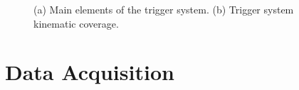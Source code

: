 \begin{figure}[!h]
  \centering
	\caption{(a) Main elements of the trigger system. (b) Trigger system kinematic coverage.}
	\label{pic:trigger}
\end{figure}


\section{Data Acquisition}

